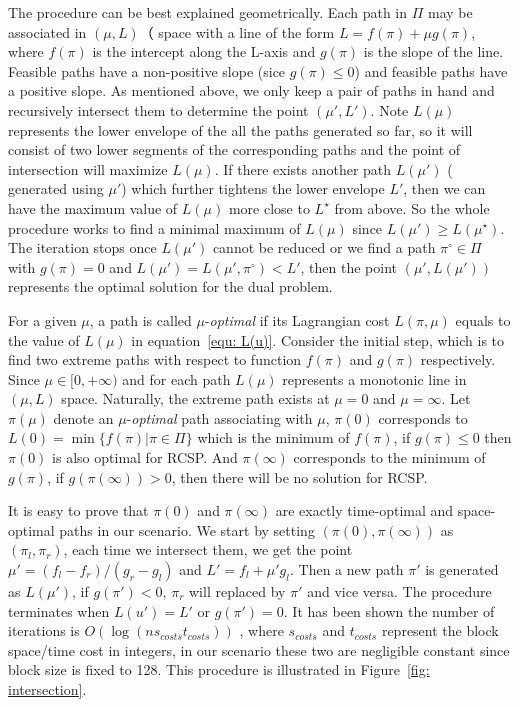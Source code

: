 \documentclass{sig-alternate-05-2015}
\begin{document}
The procedure can be best explained geometrically.
Each path in $ \Pi $ may be associated in $ (\mu, L)（$ space with a line of the form $ L = f(\pi) + \mu g(\pi) $, where $ f(\pi) $ is the intercept along the L-axis and $ g(\pi) $ is the slope of the line.
Feasible paths have a non-positive slope (sice $ g(\pi) \leqslant 0 $) and feasible paths have a positive slope.
As mentioned above, we only keep a pair of paths in hand and recursively intersect them to determine the point $ (\mu',L') $.
Note $ L(\mu) $ represents the lower envelope of the all the paths generated so far, so it will consist of two lower segments of the corresponding paths and the point of intersection will maximize $ L(\mu) $.
If there exists another path $ L(\mu') $ ( generated using $ \mu' $) which further tightens the lower envelope $ L' $, then we can have the maximum value of $ L(\mu) $ more close to $ L^\star $ from above.
So the whole procedure works to find a minimal maximum of $ L(\mu) $ since $ L(\mu') \geqslant L(\mu^\star) $.
The iteration stops once $ L(\mu') $ cannot be reduced or we find a path $ \pi^\circ \in \Pi $ with $ g(\pi) = 0 $ and $ L(\mu') = L(\mu', \pi^\circ) < L' $, then the point $ (\mu', L(\mu')) $ represents the optimal solution for the dual problem.

For a given $ \mu $, a path is called $ \mu $-\textit{optimal} if its Lagrangian cost $ L(\pi,\mu) $ equals to the value of $ L(\mu) $ in equation~\eqref{equ: L(u)}.
Consider the initial step, which is to find two extreme paths with respect to function $ f(\pi) $ and $ g(\pi) $ respectively.
Since $ \mu \in [0,+\infty) $ and for each path $ L(\mu) $ represents a monotonic line in $ (\mu,L) $ space.
Naturally, the extreme path exists at $ \mu = 0 $ and $ \mu=\infty $.
Let $ \pi(\mu) $ denote an $ \mu $-\textit{optimal} path associating with $ \mu $,
$ \pi(0) $ corresponds to $ L(0) = \min\{f(\pi)|\pi \in \Pi\} $ which is the minimum of $ f(\pi) $, if $ g(\pi) \leqslant 0 $ then $ \pi(0) $ is also optimal for RCSP.
And $ \pi(\infty) $ corresponds to the minimum of $ g(\pi) $, if $ g(\pi(\infty)) > 0 $, then there will be no solution for RCSP.

It is easy to prove that $ \pi(0) $ and $ \pi(\infty) $ are exactly time-optimal and space-optimal paths in our scenario.
We start by setting $ (\pi(0),\pi(\infty)) $ as $ (\pi_l,\pi_r) $, each time we intersect them, we get the point $ \mu' = (f_l - f_r)/(g_r-g_l) $ and $ L'= f_l + \mu' g_l $.
Then a new path $ \pi' $ is generated as $ L(\mu') $, if $ g(\pi') < 0 $, $ \pi_r $ will replaced by $ \pi' $ and vice versa.
The procedure terminates when $ L(u') = L' $ or $ g(\pi') = 0 $.
It has been shown the number of iterations is $ O(\log(n s_{costs} t_{costs})) $ \cite{mehlhorn2000resource}, where $ s_{costs} $ and $ t_{costs} $ represent the block space/time cost in integers, in our scenario these two are negligible constant since block size is fixed to 128.
This procedure is illustrated in Figure~\ref{fig: intersection}.
\end{document}
